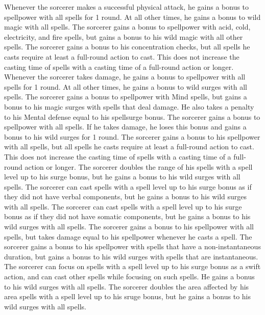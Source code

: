 Whenever the sorcerer makes a successful physical attack, he gains a bonus to spellpower with all spells for 1 round.
At all other times, he gains a bonus to wild magic with all spells.
The sorcerer gains a bonus to spellpower with acid, cold, electricity, and fire spells, but gains a bonus to his wild magic with all other spells.
The sorcerer gains a bonus to his concentration checks, but all spells he casts require at least a full-round action to cast.
This does not increase the casting time of spells with a casting time of a full-round action or longer.
Whenever the sorcerer takes damage, he gains a bonus to spellpower with all spells for 1 round.
At all other times, he gains a bonus to wild surges with all spells.
The sorcerer gains a bonus to spellpower with Mind spells, but gains a bonus to his magic surges with spells that deal damage.
He also takes a penalty to his Mental defense equal to his spellsurge bonus.
The sorcerer gains a bonus to spellpower with all spells.
If he takes damage, he loses this bonus and gains a bonus to his wild surges for  1 round.
The sorcerer gains a bonus to his spellpower with all spells, but all spells he casts require at least a full-round action to cast.
This does not increase the casting time of spells with a casting time of a full-round action or longer.
The sorcerer doubles the range of his spells with a spell level up to his surge bonus, but he gains a bonus to his wild surges with all spells.
The sorcerer can cast spells with a spell level up to his surge bonus as if they did not have verbal components, but he gains a bonus to his wild surges with all spells.
The sorcerer can cast spells with a spell level up to his surge bonus as if they did not have somatic components, but he gains a bonus to his wild surges with all spells.
The sorcerer gains a bonus to his spellpower with all spells, but takes damage equal to his spellpower whenever he casts a spell.
The sorcerer gains a bonus to his spellpower with spells that have a non-instantaneous duration, but gains a bonus to his wild surges with spells that are instantaneous.
The sorcerer can focus on spells with a spell level up to his surge bonus as a swift action, and can cast other spells while focusing on such spells.
He gains a bonus to his wild surges with all spells.
The sorcerer doubles the area affected by his area spells with a spell level up to his sruge bonus, but he gains a bonus to his wild surges with all spells.

